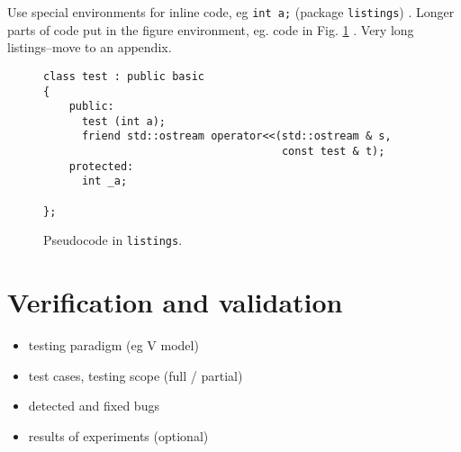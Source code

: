 \documentclass[a4paper,twoside,12pt]{book}
\begin{document}


Use special environments for inline code, eg  \lstinline|int a;| (package \texttt{listings})%
. Longer parts of code put in the figure environment, eg. code in Fig. \ref{fig:pseudocode:listings}%
. Very long listings–move to an appendix.


\clearpage
\begin{figure}
\centering
\begin{lstlisting}
class test : public basic
{
    public:
      test (int a);
      friend std::ostream operator<<(std::ostream & s, 
                                     const test & t);
    protected:
      int _a;  
      
};
\end{lstlisting}
\caption{Pseudocode in \texttt{listings}.}
\label{fig:pseudocode:listings}
\end{figure}

%      




\chapter{Verification and validation}
\begin{itemize}
\item testing paradigm (eg V model)
\item test cases, testing scope (full / partial)
\item detected and fixed bugs
\item results of experiments (optional)
\end{itemize}
\end{document}
